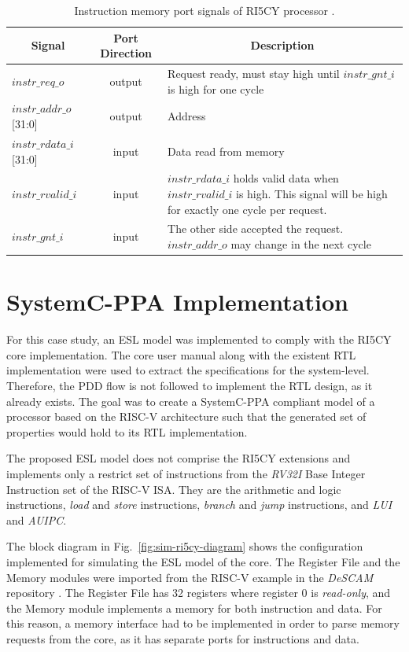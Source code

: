 \begin{table}[htb!] 
	\centering 
	\caption{Instruction memory port signals of RI5CY processor \cite{manual-ri5cy}.} 
	\label{tab:imem-signals}
	\begin{tabular}{l|c|p{7cm}} 
		\multicolumn{1}{c}{\bfseries Signal} & \multicolumn{1}{c}{\bfseries Port Direction} & \multicolumn{1}{c}{\bfseries Description} \\     
		\hline	
		$instr\_req\_o$  &  output & Request ready, must stay high until $instr\_gnt\_i$ is high for one cycle \\
		\hline
		$instr\_addr\_o$[31:0]  &  output & Address \\
		\hline
		$instr\_rdata\_i$[31:0]  &  input & Data read from memory \\
		\hline
		$instr\_rvalid\_i$  &  input & $instr\_rdata\_i$ holds valid data when $instr\_rvalid\_i$ is high. This signal will be high for exactly one cycle per request. \\
		\hline
		$instr\_gnt\_i$  &  input & The other side accepted the request. $instr\_addr\_o$ may change in the next cycle \\
		\hline
	\end{tabular} 
\end{table}

\section{SystemC-PPA Implementation}
\label{section:ri5cy-systemc-ppa}

For this case study, an ESL model was implemented to comply with the RI5CY core implementation. The core user manual along with the existent RTL implementation were used to extract the specifications for the system-level. Therefore, the PDD flow is not followed to implement the RTL design, as it already exists. The goal was to create a SystemC-PPA compliant model of a processor based on the RISC-V architecture such that the generated set of properties would hold to its RTL implementation.

The proposed ESL model does not comprise the RI5CY extensions and implements only a restrict set of instructions from the \textit{RV32I} Base Integer Instruction set of the RISC-V ISA. They are the arithmetic and logic instructions, \textit{load} and \textit{store} instructions, \textit{branch} and \textit{jump} instructions, and \textit{LUI} and \textit{AUIPC}.

The block diagram in Fig.~\ref{fig:sim-ri5cy-diagram} shows the configuration implemented for simulating the ESL model of the core. The Register File and the Memory modules were imported from the RISC-V example in the \textit{DeSCAM} repository \cite{descam}. The Register File has 32 registers where register 0 is \textit{read-only}, and the Memory module implements a memory for both instruction and data. For this reason, a memory interface had to be implemented in order to parse memory requests from the core, as it has separate ports for instructions and data.

